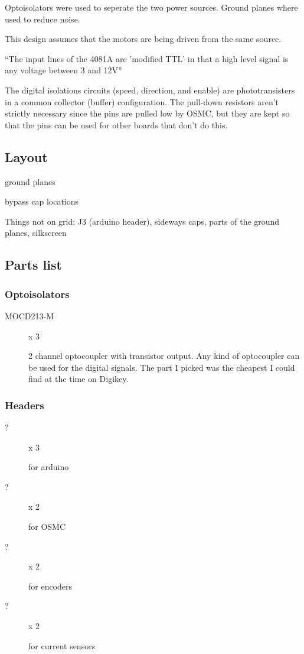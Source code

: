 \documentclass[letterpaper,12pt,notitlepage]{report}
\begin{document}
Optoisolators were used to seperate the two power sources.  Ground planes where used to reduce noise.

This design assumes that the motors are being driven from the same source.

\textquotedblleft The input lines of the 4081A are 'modified TTL' in that a high level signal is any voltage between 3 and 12V\textquotedblright

The digital isolations circuits (speed, direction, and enable) are phototransisters in a common collector (buffer) configuration.  The pull-down resistors aren't strictly necessary since the pins are pulled low by OSMC, but they are kept so that the pins can be used for other boards that don't do this.



\subsection{Layout}

ground planes

bypass cap locations

Things not on grid:  J3 (arduino header), sideways caps, parts of the ground planes, silkscreen

\subsection{Parts list}
\subsubsection{Optoisolators}
\begin{description}
 \item[MOCD213-M] x 3

2 channel optocoupler with transistor output.  Any kind of optocoupler can be used for the digital signals.  The part I picked was the cheapest I could find at the time on Digikey.

\end{description}

\subsubsection{Headers}
\begin{description}
 \item[?] x 3

for arduino

 \item[?] x 2

for OSMC

 \item[?] x 2

for encoders

 \item[?] x 2

for current sensors

 \end{description}
\end{document}
